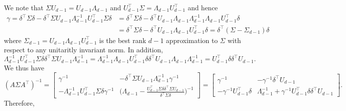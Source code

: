 \documentclass[10pt]{article}
\begin{document}
We note that $\Sigma U_{d-1} = U_{d-1} \Lambda_{d-1}$ and $U_{d-1}^{\top} \Sigma = \Lambda_{d-1} U_{d-1}^{\top}$ and hence
\begin{equation*}
\begin{split}
 \gamma = \delta^{\top} \Sigma \delta - \delta^{\top} \Sigma U_{d-1} \Lambda_{d-1}^{-1} U_{d-1}^{\top} \Sigma \delta &= \delta^{\top} \Sigma \delta - \delta^{\top} U_{d-1} \Lambda_{d-1} \Lambda_{d-1}^{-1} \Lambda_{d-1} U_{d-1}^{\top} \delta \\ & =  \delta^{\top} \Sigma \delta - \delta^{\top} U_{d-1} \Lambda_{d-1} U_{d-1}^{\top} \delta = \delta^{\top} (\Sigma - \Sigma_{d-1}) \delta
 \end{split}
 \end{equation*}
 where $\Sigma_{d-1} = U_{d-1} \Lambda_{d-1} U_{d-1}^{\top}$ is the best rank $d-1$ approximation to $\Sigma$ with respect to any unitaritly invariant norm. In addition,
 $$ \Lambda_{d-1}^{-1} U_{d-1}^{\top} \Sigma \delta \delta^{\top} \Sigma U_{d-1} \Lambda_{d-1}^{-1} = \Lambda_{d-1}^{-1} \Lambda_{d-1} U_{d-1}^{\top} \delta \delta^{\top} U_{d-1} \Lambda_{d-1} \Lambda_{d-1}^{-1} = U_{d-1}^{\top} \delta \delta^{\top} U_{d-1}.$$
 We thus have
 \begin{equation*}
 (A \Sigma A^{\top})^{-1} = \begin{bmatrix} \gamma^{-1} & - \delta^{\top} \Sigma U_{d-1} \Lambda_{d-1}^{-1} \gamma^{-1} \\
- \Lambda_{d-1}^{-1} U_{d-1}^{\top} \Sigma \delta \gamma^{-1} & \bigl(\Lambda_{d-1} - \frac{U_{d-1}^{\top} \Sigma \delta \delta^{\top} \Sigma U_{d-1}}{\delta^{\top} \Sigma \delta} \bigr)^{-1} \end{bmatrix} = \begin{bmatrix} \gamma^{-1} & - \gamma^{-1} \delta^{\top} U_{d-1} \\ - \gamma^{-1} U_{d-1}^{\top} \delta & \Lambda_{d-1}^{-1} + \gamma^{-1}  U_{d-1}^{\top} \delta \delta^{\top} U_{d-1} \end{bmatrix}.
 \end{equation*}
 Therefore,
\end{document}
